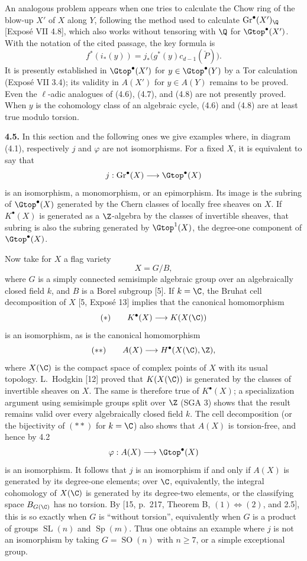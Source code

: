 An analogous problem appears when one tries to calculate the Chow ring of
the blow-up $X'$ of $X$ along $Y$, following the method used to calculate
$\operatorname{Gr}^\bullet(X')_\Q$ [Exposé VII 4.8], which also works
without tensoring with $\Q$ for $\Gtop^\bullet(X')$. With the notation of
the cited passage, the key formula is
\begin{equation}\tag{4.8}
 f^*(i_*(y))=j_*\bigl(g^*(y)c_{d-1}(\check P)\bigr).
\end{equation}
It is presently established in $\Gtop^\bullet(X')$ for
$y\in\Gtop^\bullet(Y)$ by a Tor calculation (Exposé VII 3.4); its validity
in $A(X')$ for $y\in A(Y)$ remains to be proved. Even the $\ell$-adic
analogues of (4.6), (4.7), and (4.8) are not presently proved. When $y$ is
the cohomology class of an algebraic cycle, (4.6) and (4.8) are at least
true modulo torsion.

\textbf{4.5.} In this section and the following ones we give examples where,
in diagram (4.1), respectively $j$ and $\varphi$ are not isomorphisms. For
a fixed $X$, it is equivalent to say that
\[
 j:\operatorname{Gr}^\bullet(X)\longrightarrow\Gtop^\bullet(X)
\]
is an isomorphism, a monomorphism, or an epimorphism. Its image is the
subring of $\Gtop^\bullet(X)$ generated by the Chern classes of locally free
sheaves on $X$. If $K^\bullet(X)$ is generated as a $\Z$-algebra by the
classes of invertible sheaves, that subring is also the subring generated
by $\Gtop^1(X)$, the degree-one component of $\Gtop^\bullet(X)$.

Now take for $X$ a flag variety
\[
 X=G/B,
\]
where $G$ is a simply connected semisimple algebraic group over an
algebraically closed field $k$, and $B$ is a Borel subgroup [5]. If
$k=\C$, the Bruhat cell decomposition of $X$ [5, Exposé 13] implies that
the canonical homomorphism
\[
 (*)\qquad K^\bullet(X)\longrightarrow K(X(\C))
\]
is an isomorphism, as is the canonical homomorphism
\[
 (**)\qquad A(X)\longrightarrow H^\bullet(X(\C),\Z),
\]
where $X(\C)$ is the compact space of complex points of $X$ with its usual
topology. L.~Hodgkin [12] proved that $K(X(\C))$ is generated by the
classes of invertible sheaves on $X$. The same is therefore true of
$K^\bullet(X)$; a specialization argument using semisimple groups split
over $\Z$ (SGA 3) shows that the result remains valid over every
algebraically closed field $k$. The cell decomposition (or the bijectivity
of $(**)$ for $k=\C$) also shows that $A(X)$ is torsion-free, and hence by
4.2
\[
 \varphi:A(X)\longrightarrow\Gtop^\bullet(X)
\]
is an isomorphism. It follows that $j$ is an isomorphism if and only if
$A(X)$ is generated by its degree-one elements; over $\C$, equivalently,
the integral cohomology of $X(\C)$ is generated by its degree-two elements,
or the classifying space $B_{G(\C)}$ has no torsion. By [15, p.~217,
Theorem B, $(1)\Leftrightarrow(2)$, and 2.5], this is so exactly when $G$ is
``without torsion'', equivalently when $G$ is a product of groups
$\operatorname{SL}(n)$ and $\operatorname{Sp}(m)$. Thus one obtains an
example where $j$ is not an isomorphism by taking $G=\operatorname{SO}(n)$
with $n\geq7$, or a simple exceptional group.

